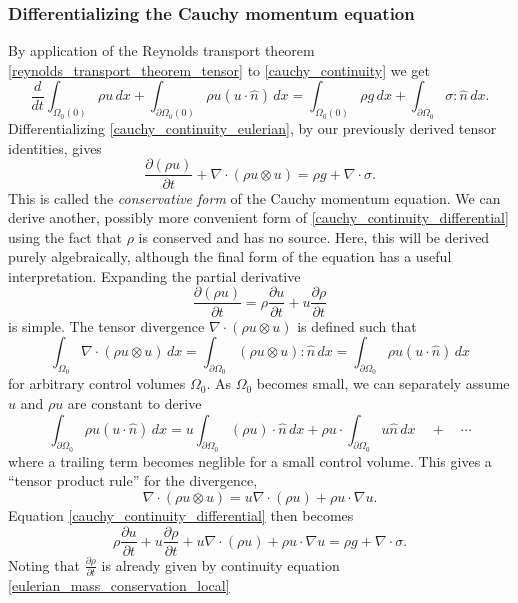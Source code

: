 \documentclass[11pt,a4paper]{memoir}
\newcommand{\pomn}{{\partial\Omega_0}}
\newcommand{\Part}[2]{\frac{\partial #1}{\partial #2}}
\begin{document}
\subsubsection{Differentializing the Cauchy momentum equation}
By application of the Reynolds transport theorem \eqref{reynolds_transport_theorem_tensor} to \eqref{cauchy_continuity} we get
\begin{equation}\label{cauchy_continuity_eulerian}
    \frac{d}{dt}\int_{\Omega_0(0)}\rho u\,dx + \int_{\partial\Omega_0(0)}\rho u (u\cdot \hat{n})\,dx = \int_{\Omega_0(0)} \rho g\,dx + \int_{\pomn} \sigma:\hat{n}\,dx.
\end{equation}
Differentializing \eqref{cauchy_continuity_eulerian}, by our previously derived tensor identities, gives
\begin{equation}\label{cauchy_continuity_differential}
    \Part{(\rho u)}{t} + \nabla \cdot (\rho u\otimes u) = \rho g + \nabla\cdot\sigma.
\end{equation}
This is called the \textit{conservative form} of the Cauchy momentum equation.
We can derive another, possibly more convenient form of \eqref{cauchy_continuity_differential} using the fact that
$\rho$ is conserved and has no source. Here, this will be derived purely algebraically, although the final form of the equation
has a useful interpretation. Expanding the partial derivative
$$
    \Part{(\rho u)}{t} = \rho\Part{u}{t} + u\Part{\rho}{t}
$$
is simple. The tensor divergence $\nabla \cdot (\rho u\otimes u)$ is defined such that
$$
    \int_{\Omega_0} \nabla \cdot (\rho u\otimes u)\,dx = \int_{\pomn} (\rho u\otimes u) : \hat{n}\,dx = \int_{\pomn} \rho u (u\cdot\hat{n})\,dx
$$
for arbitrary control volumes $\Omega_0$. As $\Omega_0$ becomes small, we can separately assume $u$ and $\rho u$ are constant
to derive
$$
    \int_{\pomn} \rho u (u\cdot\hat{n})\,dx = u\int_{\pomn}(\rho u)\cdot\hat{n}\,dx
                                              + \rho u\cdot \int_{\pomn} u\hat{n}\,dx \quad+\quad\cdots
$$
where a trailing term becomes neglible for a small control volume. This gives a ``tensor product rule'' for the divergence,
\begin{equation}\label{cauchy_divergence_tensor_product}
    \nabla\cdot (\rho u \otimes u) = u\nabla\cdot (\rho u) + \rho u\cdot\nabla u.
\end{equation}
Equation \eqref{cauchy_continuity_differential} then becomes
$$
    \rho\Part{u}{t} + u\Part{\rho}{t} + u\nabla\cdot (\rho u) + \rho u\cdot\nabla u = \rho g + \nabla\cdot\sigma.
$$
Noting that $\Part{\rho}{t}$ is already given by continuity equation \eqref{eulerian_mass_conservation_local}
\end{document}
